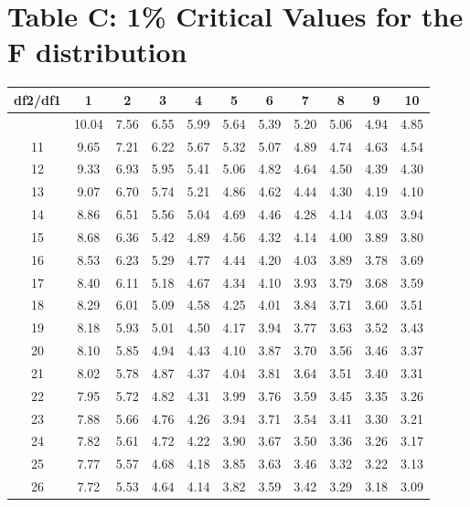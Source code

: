 \documentclass[
]{book}
\theoremstyle{definition}
\theoremstyle{definition}
\theoremstyle{definition}
\theoremstyle{definition}
\theoremstyle{remark}
\begin{document}
\hypertarget{table-c-1-critical-values-for-the-f-distribution}{%
\section*{Table C: 1\% Critical Values for the F distribution}\label{table-c-1-critical-values-for-the-f-distribution}}

\begin{longtable}[]{@{}ccccccccccc@{}}
\toprule\noalign{}
df2/df1 & 1 & 2 & 3 & 4 & 5 & 6 & 7 & 8 & 9 & 10 \\
\midrule\noalign{}
\endhead
\bottomrule\noalign{}
\endlastfoot
10 & 10.04 & 7.56 & 6.55 & 5.99 & 5.64 & 5.39 & 5.20 & 5.06 & 4.94 & 4.85 \\
11 & 9.65 & 7.21 & 6.22 & 5.67 & 5.32 & 5.07 & 4.89 & 4.74 & 4.63 & 4.54 \\
12 & 9.33 & 6.93 & 5.95 & 5.41 & 5.06 & 4.82 & 4.64 & 4.50 & 4.39 & 4.30 \\
13 & 9.07 & 6.70 & 5.74 & 5.21 & 4.86 & 4.62 & 4.44 & 4.30 & 4.19 & 4.10 \\
14 & 8.86 & 6.51 & 5.56 & 5.04 & 4.69 & 4.46 & 4.28 & 4.14 & 4.03 & 3.94 \\
15 & 8.68 & 6.36 & 5.42 & 4.89 & 4.56 & 4.32 & 4.14 & 4.00 & 3.89 & 3.80 \\
16 & 8.53 & 6.23 & 5.29 & 4.77 & 4.44 & 4.20 & 4.03 & 3.89 & 3.78 & 3.69 \\
17 & 8.40 & 6.11 & 5.18 & 4.67 & 4.34 & 4.10 & 3.93 & 3.79 & 3.68 & 3.59 \\
18 & 8.29 & 6.01 & 5.09 & 4.58 & 4.25 & 4.01 & 3.84 & 3.71 & 3.60 & 3.51 \\
19 & 8.18 & 5.93 & 5.01 & 4.50 & 4.17 & 3.94 & 3.77 & 3.63 & 3.52 & 3.43 \\
20 & 8.10 & 5.85 & 4.94 & 4.43 & 4.10 & 3.87 & 3.70 & 3.56 & 3.46 & 3.37 \\
21 & 8.02 & 5.78 & 4.87 & 4.37 & 4.04 & 3.81 & 3.64 & 3.51 & 3.40 & 3.31 \\
22 & 7.95 & 5.72 & 4.82 & 4.31 & 3.99 & 3.76 & 3.59 & 3.45 & 3.35 & 3.26 \\
23 & 7.88 & 5.66 & 4.76 & 4.26 & 3.94 & 3.71 & 3.54 & 3.41 & 3.30 & 3.21 \\
24 & 7.82 & 5.61 & 4.72 & 4.22 & 3.90 & 3.67 & 3.50 & 3.36 & 3.26 & 3.17 \\
25 & 7.77 & 5.57 & 4.68 & 4.18 & 3.85 & 3.63 & 3.46 & 3.32 & 3.22 & 3.13 \\
26 & 7.72 & 5.53 & 4.64 & 4.14 & 3.82 & 3.59 & 3.42 & 3.29 & 3.18 & 3.09 \\

\end{longtable}
\end{document}
